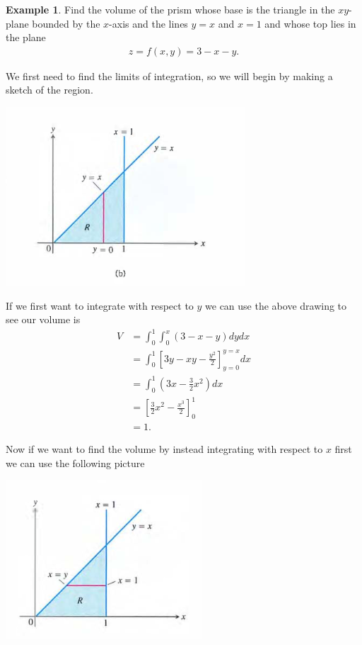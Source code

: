 \documentclass[12pt, letter]{article}
\theoremstyle{plain}
\numberwithin{theorem}{section}
\theoremstyle{definition}
\newtheorem{example}[theorem]{Example}
\begin{document}
\begin{example}
Find the volume of the prism whose base is the triangle in the $xy$-plane bounded by the $x$-axis and the lines $y=x$ and $x=1$ and whose top lies in the plane
\begin{align*}
z=f(x,y) = 3-x-y.
\end{align*}

\bigskip

We first need to find the limits of integration, so we will begin by making a sketch of the region.

\bigskip

\begin{center}
\includegraphics[scale=0.7]{m3_f5}
\end{center}

\bigskip

If we first want to integrate with respect to $y$ we can use the above drawing to see our volume is
\begin{align*}
V&=\int_0^1 \int_0^x (3-x-y)dydx\\
&=\int_0^1 \left[3y-xy-\frac{y^2}{2}\right]_{y=0}^{y=x} dx\\
&= \int_0^1 \left(3x-\frac{3}{2}x^2\right)dx\\
&=\left[\frac{3}{2}x^2-\frac{x^3}{2}\right]_0^1\\
&=1.
\end{align*}

Now if we want to find the volume by instead integrating with respect to $x$ first we can use the following picture

\bigskip

\begin{center}
\includegraphics[scale=0.7]{m3_f6}
\end{center}


\end{example}
\end{document}
